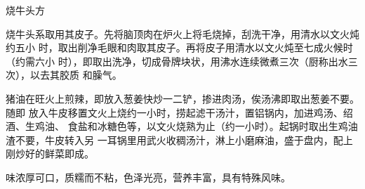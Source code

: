 %
%
%
%
%
%
%
\begin{recipe}{烧牛头方}

\ingredients


\preparation

烧牛头系取用其皮子。先将脑顶肉在炉火上将毛烧掉，刮洗干净，用清水以文火炖约五小
时，取出削净毛眼和肉取其皮子。再将皮子用清水以文火炖至七成火候时（约需六小
时），即取出洗净，切成骨牌块状，用沸水连续微煮三次（厨称出水三次），以去其胶质
和臊气。

猪油在旺火上煎辣，即放入葱姜快炒一二铲，掺进肉汤，俟汤沸即取出葱姜不要。随即
放入牛皮移置文火上烧约一小时，捞起滤干汤汁，置铝锅内，加进鸡汤、绍酒、生鸡油、
食盐和冰糖色等，以文火烧熟为止（约一小时）。起锅时取出生鸡油渣不要，牛皮转入另
一耳锅里用武火收稠汤汁，淋上小磨麻油，盛于盘内，配上刚炒好的鲜菜即成。

\features

味浓厚可口，质糯而不粘，色泽光亮，营养丰富，具有特殊风味。

\end{recipe}

